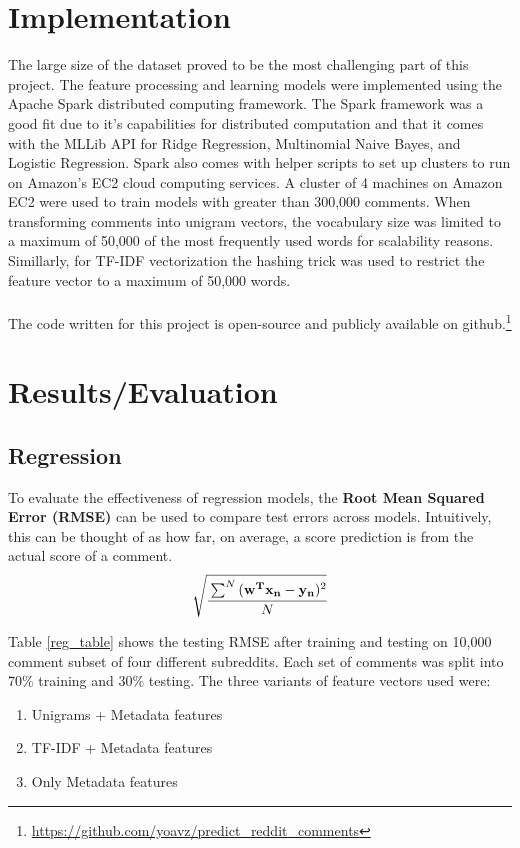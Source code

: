 \documentclass[11pt, twocolumn]{article}
\begin{document}
\section{Implementation}
	The large size of the dataset proved to be the most challenging part of this project. The feature processing and learning models were implemented using the Apache Spark \cite{spark} distributed computing framework. The Spark framework was a good fit due to it's capabilities for distributed computation and that it comes with the MLLib API for Ridge Regression, Multinomial Naive Bayes, and Logistic Regression. Spark also comes with helper scripts to set up clusters to run on Amazon's EC2 cloud computing services. A cluster of 4 machines on Amazon EC2 were used to train models with greater than 300,000 comments. When transforming comments into unigram vectors, the vocabulary size was limited to a maximum of 50,000 of the most frequently used words for scalability reasons. Simillarly, for TF-IDF vectorization the hashing trick \cite{hashing} was used to restrict the feature vector to a maximum of 50,000 words. \\
	\\
	The code written for this project is open-source and publicly available on github.\footnote{\url{https://github.com/yoavz/predict_reddit_comments}}

\section{Results/Evaluation}

	\subsection{Regression}
	To evaluate the effectiveness of regression models, the \textbf{Root Mean Squared Error (RMSE)} can be used to compare test errors across models. Intuitively, this can be thought of as how far, on average, a score prediction is from the actual score of a comment.
	\begin{gather*}
		\sqrt{\cfrac{\sum^N{(\mathbf{w^T} \mathbf{x_n} - \mathbf{y_n})^2}}{N}}
	\end{gather*}
	
	Table \ref{reg_table} shows the testing RMSE after training and testing on 10,000 comment subset of four different subreddits. Each set of comments was split into 70\% training and 30\% testing. The three variants of feature vectors used were:
	\begin{enumerate}
		\setlength\itemsep{0em}
		\item Unigrams + Metadata features
		\item TF-IDF + Metadata features
		\item Only Metadata features
	\end{enumerate}
	
\end{document}
